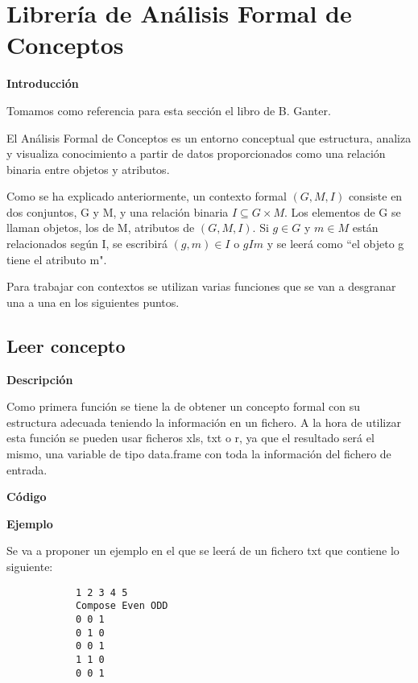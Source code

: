 \section{Librer\'ia de An\'alisis Formal de Conceptos}

\textbf{Introducci\'on}

Tomamos como referencia para esta secci\'on el libro de B. Ganter\cite{ganter}.

El An\'alisis Formal de Conceptos es un entorno conceptual que estructura, analiza y visualiza conocimiento a partir de datos proporcionados 
como una relaci\'on binaria entre objetos y atributos.

Como se ha explicado anteriormente, un contexto formal \( (G, M, I) \) consiste en dos conjuntos, G y M, y una relaci\'on binaria \( I \subseteq G \times M \). Los elementos 
de G se llaman objetos, los de M, atributos de \( (G, M, I) \). Si \(g \in G\) y \( m \in M \) est\'an relacionados seg\'un I, se escribir\'a 
\( (g,m) \in I \) o \( g I m \) y se leer\'a como ``el objeto g tiene el atributo m".

Para trabajar con contextos se utilizan varias funciones que se van a desgranar una a una en los siguientes puntos.

    \subsection{Leer concepto}

        \textbf{Descripci\'on}

        Como primera funci\'on se tiene la de obtener un concepto formal con su estructura adecuada teniendo la informaci\'on en un fichero. A la 
        hora de utilizar esta funci\'on se pueden usar ficheros xls, txt o r, ya que el resultado ser\'a el mismo, una variable de tipo data.frame 
        con toda la informaci\'on del fichero de entrada.
        \\

        \bigskip

        \textbf{C\'odigo}

        
        \bigskip

        \textbf{Ejemplo}

        Se va a proponer un ejemplo en el que se leer\'a de un fichero txt que contiene lo siguiente:

        \begin{verbatim}
            1 2 3 4 5
            Compose Even ODD
            0 0 1
            0 1 0
            0 0 1
            1 1 0
            0 0 1
        \end{verbatim}

